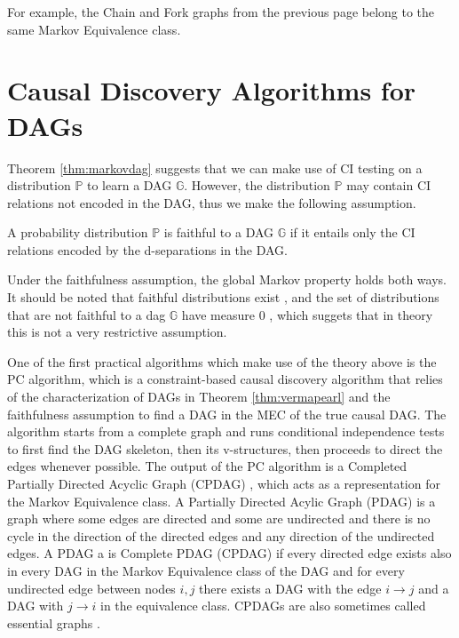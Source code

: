 \documentclass{tufte-book}
\begin{document}
For example, the Chain and Fork graphs from the previous page belong to the same Markov Equivalence class.

\section{Causal Discovery Algorithms for DAGs}
\label{sec:orgf672532}

Theorem \ref{thm:markovdag} suggests that we can make use of CI testing on a distribution \(\mathbb{P}\) to learn a DAG \(\mathbb{G}\). However, the distribution \(\mathbb{P}\) may contain CI relations not encoded in the DAG, thus we make the following assumption.

\begin{definition}[Faithfulness]\label{def:faithfulness}

A probability distribution $\mathbb{P}$ is faithful to a DAG $\mathbb{G}$ if it entails only the CI relations encoded by the d-separations in the DAG.

\end{definition}

Under the faithfulness assumption, the global Markov property holds both ways. It should be noted that faithful distributions exist \cite{meek-1995-stron-compl}, and the set of distributions that are not faithful to a dag \(\mathbb{G}\) have measure \(0\) \cite{uhler-2013-geomet-faith}, which suggets that in theory this is not a very restrictive assumption.



One of the first practical algorithms which make use of the theory above is the PC algorithm, \cite{spirtes-2000-causation-prediction-search,kalisch-2007-estim-high} which is a constraint-based causal discovery algorithm that relies of the characterization of DAGs in Theorem \ref{thm:vermapearl} and the faithfulness assumption to find a DAG in the MEC of the true causal DAG. The algorithm starts from a complete graph and runs conditional independence tests to first find the DAG skeleton, then its v-structures, then proceeds to direct the edges whenever possible. The output of the PC algorithm is a Completed Partially Directed Acyclic Graph (CPDAG) \cite{meek-1995-causal-infer}, which acts as a representation for the Markov Equivalence class. A Partially Directed Acylic Graph (PDAG) is a graph where some edges are directed and some are undirected and there is no cycle in the direction of the directed edges and any direction of the undirected edges. A PDAG a is Complete PDAG (CPDAG) if every directed edge exists also in every DAG in the Markov Equivalence class of the DAG and for every undirected edge between nodes \(i,j\) there exists a DAG with the edge \(i \rightarrow j\) and a DAG with \(j \rightarrow i\) in the equivalence class. CPDAGs are also sometimes called essential graphs \cite{andersson-1997-charac-markov}.
\end{document}
